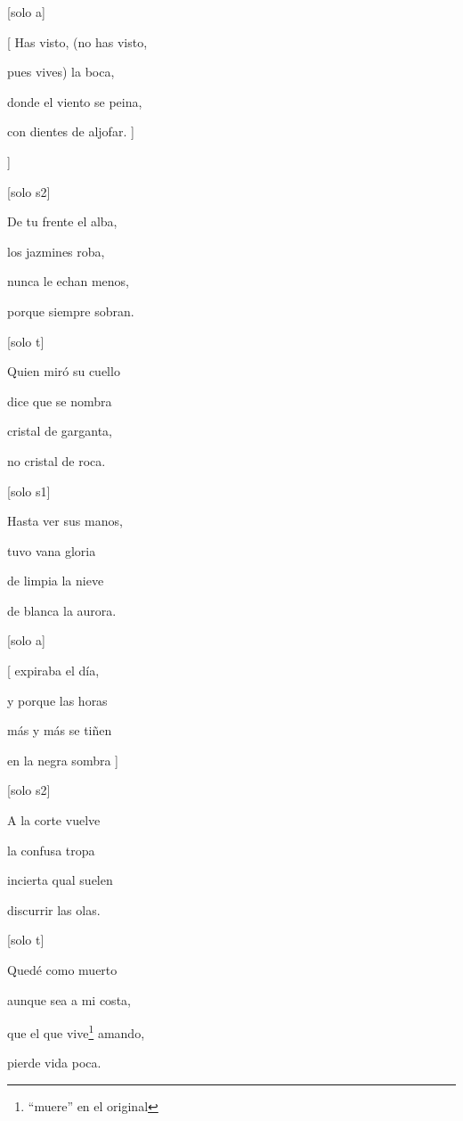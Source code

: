 \documentclass[titlepage,hidelinks]{article}
\begin{document}
{{[}solo a{]}

{[} Has visto, (no has visto,

  pues vives) la boca,

  donde el viento se peina,

  con dientes de aljofar. {]}
\vspace{2\baselineskip}

{]}

{[}solo s2{]}

De tu frente el alba,

los jazmines roba,

nunca le echan menos,

porque siempre sobran.
\vspace{2\baselineskip}

{[}solo t{]}

Quien miró su cuello

dice que se nombra

cristal de garganta,

no cristal de roca.
\vspace{2\baselineskip}

{[}solo s1{]}

Hasta ver sus manos,

tuvo vana gloria

de limpia la nieve

de blanca la aurora.
\vspace{2\baselineskip}

{[}solo a{]}

{[} expiraba el día,

  y porque las horas

  más y más se tiñen

  en la negra sombra {]}
\vspace{2\baselineskip}

{[}solo s2{]}

A la corte vuelve

la confusa tropa

incierta qual suelen

discurrir las olas.
\vspace{2\baselineskip}

{[}solo t{]}

Quedé como muerto

aunque sea a mi costa,

que el que vive\footnote{\textsuperscript{}``muere'' en el original} amando,

pierde vida poca.
\vspace{2\baselineskip}

}
\end{document}
